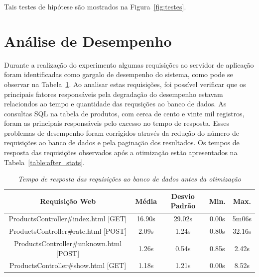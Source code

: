  Tais testes de hipótese são mostrados na Figura~\ref{fig:testes}.

\section{Análise de Desempenho}
\label{sec:analise_de_desempenho}


Durante a realização do experimento algumas requisições ao servidor de aplicação foram identificadas como gargalo de desempenho do sistema, como pode se observar na Tabela~\ref{table:before_stats}. Ao analisar estas requisições, foi possível verificar que os principais fatores responsáveis pela degradação do desempenho estavam relaciondos ao tempo e quantidade das requsições ao banco de dados. As consultas SQL na tabela de produtos, com cerca de cento e vinte mil registros, foram as principais responsáveis pelo excesso no tempo de resposta. Esses problemas de desempenho foram corrigidos através da redução do número de requisições ao banco de dados e pela paginação dos resultados. Os tempos de resposta das requisições observados após a otimização estão apresentados na Tabela~\ref{table:after_stats}.

\begin{table}\centering
\begin{tabular}{c c c c c}
\hline \hline
\textbf{Requisição Web}
& \textbf{Média}
& \textbf{Desvio Padrão}
& \textbf{Min.} 
& \textbf{Max.} \\ \hline
ProductsController\#index.html [GET]    & 16.90s & 29.02s &  0.00s &  5m06s \\
\hline
ProductsController\#rate.html [POST]    &  2.09s &  1.24s &  0.80s & 32.16s \\
\hline
ProductsController\#unknown.html [POST] &  1.26s &  0.54s &  0.85s &  2.42s \\
\hline
ProductsController\#show.html [GET]     &  1.18s &  1.21s &  0.00s &  8.52s \\
\hline
\end{tabular}
\caption{\it Tempo de resposta das requisições ao banco de dados antes da otimização \label{table:before_stats}}
\end{table}

